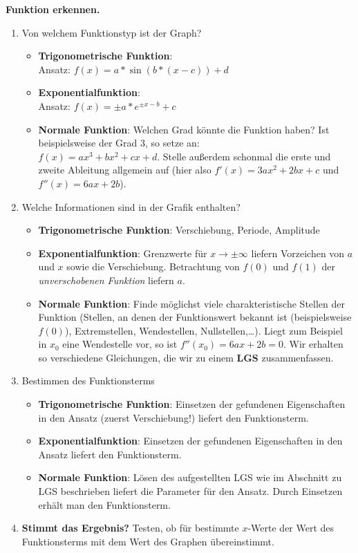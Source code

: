 \begin{koch}
  \textbf{Funktion erkennen.}
  \begin{enumerate}
    \item Von welchem Funktionstyp ist der Graph?
    \begin{itemize}
      \item \textbf{Trigonometrische Funktion}: \\
      Ansatz: $f(x)=a*\sin(b*(x-c))+d$
      \item \textbf{Exponentialfunktion}: \\
      Ansatz: $f(x)=\pm a*e^{\pm x-b}+c$
      \item \textbf{Normale Funktion}: Welchen Grad könnte die Funktion haben? Ist beispielsweise der Grad $3$, so setze an: \\
      $f(x)=ax^3+bx^2+cx+d$. Stelle außerdem schonmal die erste und zweite Ableitung allgemein auf (hier also $f'(x)=3ax^2+2bx+c$ und $f''(x)=6ax+2b$).
    \end{itemize}
    \item Welche Informationen sind in der Grafik enthalten?
    \begin{itemize}
      \item \textbf{Trigonometrische Funktion}: Verschiebung, Periode, Amplitude
      \item \textbf{Exponentialfunktion}: Grenzwerte für $x \rightarrow \pm \infty$ liefern Vorzeichen von $a$ und $x$ sowie die Verschiebung. Betrachtung von $f(0)$ und $f(1)$ der \emph{unverschobenen Funktion} liefern $a$.
      \item \textbf{Normale Funktion}: Finde möglichst viele charakteristische Stellen der Funktion (Stellen, an denen der Funktionswert bekannt ist (beispielsweise $f(0)$), Extremstellen, Wendestellen, Nullstellen,\dots). Liegt zum Beispiel in $x_0$ eine Wendestelle vor, so ist $f''(x_0)=6ax+2b=0$. Wir erhalten so verschiedene Gleichungen, die wir zu einem \textbf{LGS} zusammenfassen.
    \end{itemize}
    \item Bestimmen des Funktionsterms
    \begin{itemize}
      \item \textbf{Trigonometrische Funktion}: Einsetzen der gefundenen Eigenschaften in den Ansatz (zuerst Verschiebung!) liefert den Funktionsterm.
      \item \textbf{Exponentialfunktion}: Einsetzen der gefundenen Eigenschaften in den Ansatz liefert den Funktionsterm.
      \item \textbf{Normale Funktion}: Lösen des aufgestellten LGS wie im Abschnitt zu LGS beschrieben liefert die Parameter für den Ansatz. Durch Einsetzen erhält man den Funktionsterm.
    \end{itemize}
    \item \textbf{Stimmt das Ergebnis?} Testen, ob für bestimmte $x$-Werte der Wert des Funktionsterms mit dem Wert des Graphen übereinstimmt.
  \end{enumerate}
\end{koch}
